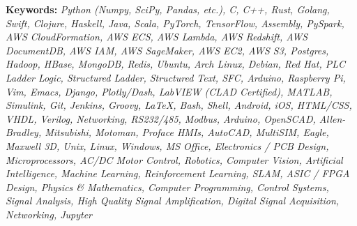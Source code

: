 \documentclass[letterpaper,11pt]{article}
\begin{document}
   \vspace*{\fill}
   \begin{center}
   \color{white}
   \tiny{\bf Keywords:}
\tiny{\it Python (Numpy, SciPy, Pandas, etc.), C, C++, Rust, Golang, Swift, Clojure,
  Haskell, Java, Scala, PyTorch, TensorFlow, Assembly, PySpark, AWS
  CloudFormation, AWS ECS, AWS Lambda, AWS Redshift, AWS DocumentDB, AWS IAM, AWS SageMaker, AWS
  EC2, AWS S3, Postgres, Hadoop, HBase, MongoDB, Redis, Ubuntu, Arch Linux, Debian,
  Red Hat, PLC Ladder Logic, Structured Ladder, Structured Text, SFC, Arduino,
  Raspberry Pi, Vim, Emacs,
  Django, Plotly/Dash, LabVIEW (CLAD Certified), MATLAB, Simulink, Git, Jenkins,
  Groovy, LaTeX, Bash, Shell, Android, iOS, HTML/CSS, VHDL, Verilog, Networking,
  RS232/485, Modbus, Arduino, OpenSCAD, Allen-Bradley, Mitsubishi, Motoman,
  Proface HMIs, AutoCAD, MultiSIM, Eagle, Maxwell 3D, Unix, Linux, Windows, MS
  Office, Electronics / PCB Design, Microprocessors, AC/DC Motor Control,
  Robotics, Computer Vision, Artificial Intelligence, Machine Learning,
  Reinforcement Learning, SLAM, ASIC / FPGA Design, Physics \& Mathematics,
  Computer Programming, Control Systems, Signal Analysis, High Quality Signal
  Amplification, Digital Signal Acquisition, Networking, Jupyter}
\end{center}
\end{document}
